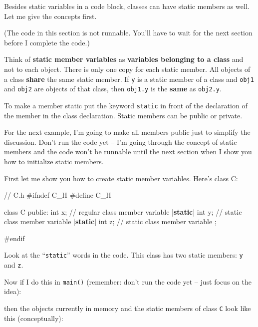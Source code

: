 Besides static variables in a code block, classes can have static
members as well. Let me give the concepts first.

(The code in this section is not runnable. You'll have
to wait for the next section before I complete the code.)

Think of \textbf{static member variables} as \textbf{variables belonging
to a class} and not to each object. There is only one copy for each
static member. All objects of a class \textbf{share} the same static
member. If \texttt{y} is a static member of a class and \texttt{obj1} and
\texttt{obj2} are objects of that class, then \texttt{obj1.y} is the
\textbf{same} as \texttt{obj2.y}.

To make a member static put the keyword \texttt{static} in front of the
declaration of the member in the class declaration. Static members can
be public or private.

For the next example, I'm going to make all members
public just to simplify the discussion. Don't run the
code yet -- I'm going through the concept of static
members and the code won't be runnable until the next
section when I show you how to initialize static members.

First let me show you how to create static member variables.
Here's class C:

\begin{consolethree}[escapeinside=||]
// C.h
#ifndef C_H
#define C_H

class C
{
public:
    int x;               // regular class member variable
    |{\bf static}| int y;       // static class member variable
    |{\bf static}| int z;       // static class member variable
};

#endif
\end{consolethree}

Look at the ``\texttt{static}'' words in the code. This class has two
static members: \texttt{y} and \texttt{z}.

Now if I do this in \texttt{main()} (remember: don't run
the code yet -- just focus on the idea):

\begin{consolethree}[escapeinside=||]
#include <iostream>
#include "C.h"

int main()
{
    C c, d, e; // 3 objects from class C
    ...
\end{consolethree}

then the objects currently in memory and the static members of class
\texttt{C} look like this (conceptually):

